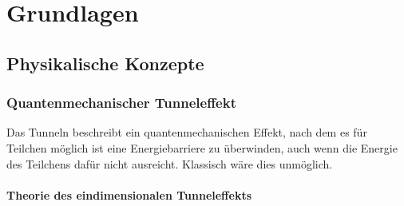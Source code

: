 \chapter{Grundlagen}

\section{Physikalische Konzepte}
    

     \subsection{Quantenmechanischer Tunneleffekt}

Das Tunneln beschreibt ein quantenmechanischen Effekt, nach dem es für Teilchen
möglich ist eine Energiebarriere zu überwinden, auch wenn die Energie des Teilchens dafür nicht ausreicht. Klassisch wäre dies unmöglich.

        \subsubsection{Theorie des eindimensionalen Tunneleffekts}

